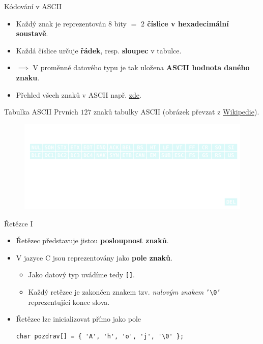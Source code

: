 \documentclass[14pt,aspectratio=169]{beamer}
\begin{document}
    \begin{frame}[t]{Kódování v ASCII}
        \begin{itemize}
            \item Každý znak je reprezentován $8$ bity $=$ \textbf{$2$ číslice v hexadecimální soustavě}.
            \item Každá číslice určuje \textbf{řádek}, resp. \textbf{sloupec} v tabulce.
            \item $\implies$ V proměnné datového typu  je tak uložena \textbf{ASCII hodnota daného znaku}.
            \item Přehled všech znaků v ASCII např. \href{https://www.asciitable.com/}{\underline{zde}}.
        \end{itemize}
    \end{frame}

    \begin{frame}{Tabulka ASCII}
        Prvních $127$ znaků tabulky ASCII (obrázek převzat z \href{https://cs.wikipedia.org/wiki/ASCII}{\underline{Wikipedie}}).
        \begin{figure}
            \centering
            \includegraphics[scale=.22]{images/ASCII_Code_Chart.png}
        \end{figure}
    \end{frame}

    \begin{frame}[t,fragile]{Řetězce \textrm{I}}
        \begin{itemize}
            \item Řetězec představuje jistou \textbf{posloupnost znaků}.
            \item V jazyce C jsou reprezentovány jako \textbf{pole znaků}.
            \begin{itemize}
                \item \markorange{$\implies$} Jako datový typ uvádíme tedy \texttt{[]}.
                \item Každý retězec je zakončen znakem tzv. \emph{nulovým znakem} \texttt{'\textbackslash0'} reprezentující konec slova.
            \end{itemize}
            \item Řetězec lze inicializovat přímo jako pole
            \begin{lstlisting}
char pozdrav[] = { 'A', 'h', 'o', 'j', '\0' };
            \end{lstlisting}
        \end{itemize}
    \end{frame}
\end{document}
